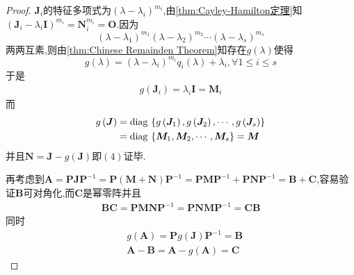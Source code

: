 {\begin{proof}
        $\bm{J}_i$的特征多项式为$\left(\lambda-\lambda_i\right)^{m_i}$,由\cref{thm:Cayley-Hamilton定理}知$
            \left(
            \bm{J}_i-\lambda_i\bm{I}
            \right)^{m_i}=
            \bm{N}_i^{m_i}=\bm{O}
        $.因为\[
            \left(\lambda-\lambda_1\right)^{m_1}\left(\lambda-\lambda_2\right)^{m_2}\cdots\left(\lambda-\lambda_s\right)^{m_s}
        \]两两互素,则由\cref{thm:Chinese Remainden Theorem}知存在$g\left(\lambda\right)$使得\[
            g\left(\lambda\right)=\left(\lambda-\lambda_i\right)^{m_i}q_i\left(\lambda\right)+\lambda_i,\forall 1\leqslant i\leqslant s
        \]于是\begin{align*}
            g\left(\bm{J}_i\right)=\lambda_i\bm{I}=\bm{M}_i
        \end{align*}而\begin{align*}
            g\left(\bm{J}\right) & =\operatorname{diag\,} \left\{
            g\left(\bm{J}_1\right),g\left(\bm{J}_2\right),\cdots,g\left(\bm{J}_s\right)
            \right\}                              \\
                                 & =\operatorname{diag\,} \left\{
            \bm{M}_1,\bm{M}_2,\cdots,\bm{M}_s
            \right\}=\bm{M}
        \end{align*}并且$\bm{N}=\bm{J}-g\left(\bm{J}\right)$即$(4)$证毕.

        再考虑到$\bm{A}=\bm{P}\bm{JP}^{-1}=\bm{P}\left(\bm{M}+\bm{N}\right)\bm{P}^{-1}=\bm{P}\bm{MP}^{-1}+\bm{P}\bm{NP}^{-1}=\bm{B}+\bm{C}$,容易验证$\bm{B}$可对角化,而$\bm{C}$是幂零阵并且\begin{align*}
            \bm{BC}=\bm{PMNP}^{-1}=\bm{PNMP}^{-1}=\bm{CB}
        \end{align*}同时\begin{align*}
             & g\left(\bm{A}\right)=\bm{P}g\left(\bm{J}\right)\bm{P}^{-1}=\bm{B} \\
             & \bm{A}-\bm{B}=\bm{A}-g\left(\bm{A}\right)=\bm{C}
        \end{align*}


\end{proof}}
